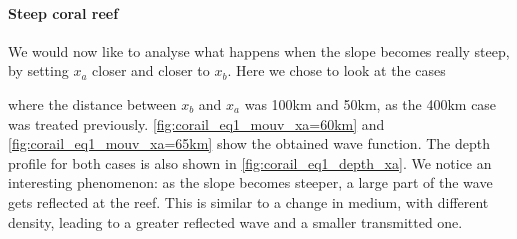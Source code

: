 \paragraph{Steep coral reef} We would now like to analyse what happens when the slope becomes really steep, by setting \(x_a\) closer and closer to \(x_b\). Here we chose to look at the cases

where the distance between \(x_b\) and \(x_a\) was 100km and 50km, as the 400km case was treated previously. \autoref{fig:corail_eq1_mouv_xa=60km} and \autoref{fig:corail_eq1_mouv_xa=65km} show the obtained wave function. The depth profile for both cases is also shown in \autoref{fig:corail_eq1_depth_xa}. We notice an interesting phenomenon: as the slope becomes steeper, a large part of the wave gets reflected at the reef. This is similar to a change in medium, with different density, leading to a greater reflected wave and a smaller transmitted one.

